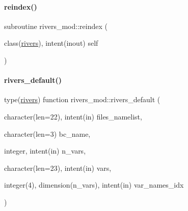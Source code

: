 \mbox{\label{namespacerivers__mod_ade2f261a72fc01d0b54f21c4e93bc86b}} 
\paragraph{\texorpdfstring{reindex()}{reindex()}}
{\footnotesize\ttfamily subroutine rivers\+\_\+mod\+::reindex (\begin{DoxyParamCaption}\item[{class(\mbox{\hyperlink{structrivers__mod_1_1rivers}{rivers}}), intent(inout)}]{self }\end{DoxyParamCaption})\hspace{0.3cm}{\ttfamily [private]}}

\mbox{\label{namespacerivers__mod_a3f4dae3b19d0f77f9f17a8059c9a9bd7}} 
\paragraph{\texorpdfstring{rivers\+\_\+default()}{rivers\_default()}}
{\footnotesize\ttfamily type(\mbox{\hyperlink{structrivers__mod_1_1rivers}{rivers}}) function rivers\+\_\+mod\+::rivers\+\_\+default (\begin{DoxyParamCaption}\item[{character(len=22), intent(in)}]{files\+\_\+namelist,  }\item[{character(len=3)}]{bc\+\_\+name,  }\item[{integer, intent(in)}]{n\+\_\+vars,  }\item[{character(len=23), intent(in)}]{vars,  }\item[{integer(4), dimension(n\+\_\+vars), intent(in)}]{var\+\_\+names\+\_\+idx }\end{DoxyParamCaption})\hspace{0.3cm}{\ttfamily [private]}}

\mbox{\label{namespacerivers__mod_ac07ba32b687341d15b82c27c197cd062}} 
